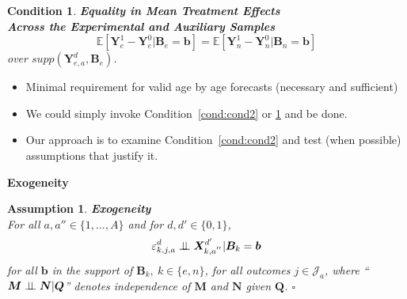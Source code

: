 \documentclass[static]{JJH-Beamer}
\newtheorem{condition}{Condition}
\newtheorem{assumption}{Assumption}
\begin{document}
\begin{frame}

\begin{condition} \textbf{Equality in Mean Treatment Effects \\Across the Experimental and Auxiliary Samples}\label{cond:cond3}
\begin{equation}
\mathbb{E} \left[ \bm{Y}_e^1 - \bm{Y}_e^0 | \bm{B}_e = \bm{b} \right] = \mathbb{E} \left[ \bm{Y}_n^1 - \bm{Y}_n^0 | \bm{B}_n = \bm{b} \right]
\end{equation}
over $supp\left(\bm{Y}^d_{e,a}, \bm{B}_e\right)$.
\end{condition}

\begin{itemize}
\item Minimal requirement for valid age by age forecasts (necessary and sufficient)
\end{itemize}

\end{frame}

\begin{frame}

\begin{itemize}
\item We could simply invoke Condition~\ref{cond:cond2} or \ref{cond:cond3} and be done.
\item Our approach is to examine Condition~\ref{cond:cond2} and test (when possible) assumptions that justify it.
\end{itemize}

\end{frame}

\begin{frame}

\begin{center}
\textbf{Exogeneity}
\end{center}

\end{frame}

\begin{frame}

\begin{assumption}\label{ass:exog} \textbf{Exogeneity}\\
For all $a, a'' \in \{ 1, \ldots, A \}$ and for $d, d' \in \{0,1\}$,
\begin{equation}
\varepsilon^d_{k,j,a} \perp\!\!\!\perp \bm{X}^{d^{\prime}}_{k,a^{''}} | \bm{B}_k = \bm{b}
\end{equation}
for all $\bm{b}$ in the support of $\bm{B}_k, \: k \in \{e,n\}$, for all outcomes $j \in \mathcal{J}_{a}$, where ``$\bm{M} \perp\!\!\!\perp \bm{N}|\bm{Q}$'' denotes independence of $\bm{M}$ and $\bm{N}$ given $\bm{Q}$. $\square$
\end{assumption}

\end{frame}
\end{document}
